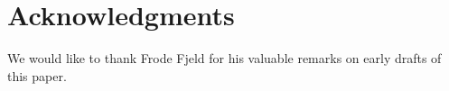 \section{Acknowledgments} 

We would like to thank Frode Fjeld for his valuable remarks on early
drafts of this paper.
